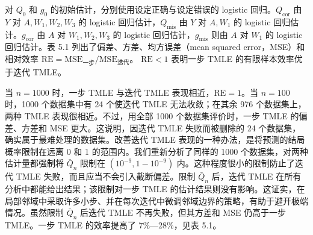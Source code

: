 对 $Q_0$ 和 $g_0$ 的初始估计，分别使用设定正确与设定错误的 logistic 回归。$Q_{\mathrm{cor}}$ 由 $Y$ 对 $A,W_1,W_2,W_3$ 的 logistic 回归估计，$Q_{\mathrm{mis}}$ 由 $Y$ 对 $A,W_1$ 的 logistic 回归估计。$g_{\mathrm{cor}}$ 由 $A$ 对 $W_1,W_2,W_3$ 的 logistic 回归估计，$g_{\mathrm{mis}}$ 则由 $A$ 对 $W_1$ 的 logistic 回归估计。表 5.1 列出了偏差、方差、均方误差（mean squared error，MSE）和相对效率
$\mathrm{RE}=\mathrm{MSE}_{\text{一步}}/\mathrm{MSE}_{\text{迭代}}$。
$\mathrm{RE}<1$ 表明一步 TMLE 的有限样本效率优于迭代 TMLE。

当 $n=1000$ 时，一步 TMLE 与迭代 TMLE 表现相近，$\mathrm{RE}=1$。当 $n=100$ 时，1000 个数据集中有 24 个使迭代 TMLE 无法收敛；在其余 976 个数据集上，两种 TMLE 表现很相近。不过，用全部 1000 个数据集评价时，一步 TMLE 的偏差、方差和 MSE 更大。这说明，因迭代 TMLE 失败而被删除的 24 个数据集，确实属于最难处理的数据集。改善迭代 TMLE 表现的一种办法，是将预测的结局概率限制在远离 0 和 1 的范围内。我们重新分析了同样的 1000 个数据集，对两种估计量都强制将 $\bar Q_n$ 限制在 $(10^{-9},1-10^{-9})$ 内。这种程度很小的限制防止了迭代 TMLE 失败，而且应当不会引入截断偏差。限制 $\bar Q_n$ 后，迭代 TMLE 在所有分析中都能给出结果；该限制对一步 TMLE 的估计结果则没有影响。这证实，在局部邻域中采取许多小步、并在每次迭代中微调邻域边界的策略，有助于避开极端情况。虽然限制 $\bar Q_n$ 后迭代 TMLE 不再失败，但其方差和 MSE 仍高于一步 TMLE。一步 TMLE 的效率提高了 7\%—28\%，见表 5.1。

